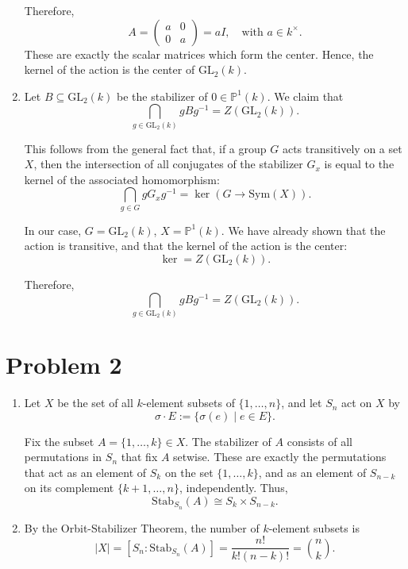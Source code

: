 \documentclass[12pt]{article}
\begin{document}
\begin{enumerate}[label=(\arabic*)]
Therefore,
\[
A = \begin{pmatrix} a & 0 \\ 0 & a \end{pmatrix} = aI, \quad \text{with } a \in k^\times.
\]
These are exactly the scalar matrices which form the center. Hence, the kernel of the action is the center of \( \mathrm{GL}_2(k) \).

\item %

Let \( B \subseteq \mathrm{GL}_2(k) \) be the stabilizer of \( 0 \in \mathbb{P}^1(k) \). We claim that
\[
\bigcap_{g \in \mathrm{GL}_2(k)} gBg^{-1} = Z(\mathrm{GL}_2(k)).
\]

This follows from the general fact that, if a group \( G \) acts transitively on a set \( X \), then the intersection of all conjugates of the stabilizer \( G_x \) is equal to the kernel of the associated homomorphism:
\[
\bigcap_{g \in G} gG_xg^{-1} = \ker(G \to \mathrm{Sym}(X)).
\]

In our case, \( G = \mathrm{GL}_2(k) \), \( X = \mathbb{P}^1(k) \). We have already shown that the action is transitive, and that the kernel of the action is the center:
\[
\ker = Z(\mathrm{GL}_2(k)).
\]

Therefore,
\[
\bigcap_{g \in \mathrm{GL}_2(k)} gBg^{-1} = Z(\mathrm{GL}_2(k)).
\]

\end{enumerate}

\section*{Problem 2}
\begin{enumerate}[label=(\arabic*)] 

\item Let \( X \) be the set of all \( k \)-element subsets of \( \{1, \dots, n\} \), and let \( S_n \) act on \( X \) by
\[
\sigma \cdot E := \{ \sigma(e) \mid e \in E \}.
\]

Fix the subset \( A = \{1, \dots, k\} \in X \). The stabilizer of \( A \) consists of all permutations in \( S_n \) that fix \( A \) setwise. These are exactly the permutations that act as an element of \( S_k \) on the set \( \{1, \dots, k\} \), and as an element of \( S_{n-k} \) on its complement \( \{k+1, \dots, n\} \), independently. Thus,
\[
\mathrm{Stab}_{S_n}(A) \cong S_k \times S_{n-k}.
\]

\item By the Orbit-Stabilizer Theorem, the number of \( k \)-element subsets is
\[
|X| = [S_n : \mathrm{Stab}_{S_n}(A)] = \frac{n!}{k!(n - k)!} = \binom{n}{k}.
\]
\end{enumerate}
\end{document}
